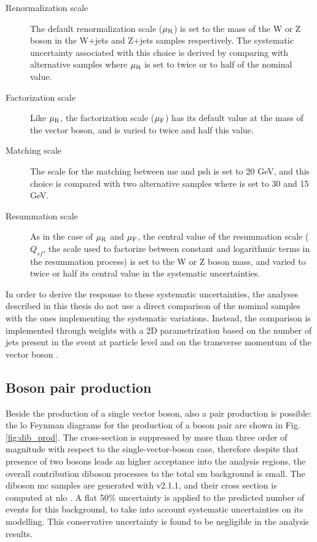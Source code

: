 \begin{description}
\item[Renormalization scale] The default renormalization scale ($\mu_{\rm{R}}$) is set to the mass of the W or Z boson in the W+jets and Z+jets samples respectively. 
The systematic uncertainty associated with this choice is derived by comparing with alternative samples where $\mu_{\rm{R}}$ is set to twice or to half of the nominal value. 

\item[Factorization scale] Like $\mu_{\rm{R}}$, the factorization scale ($\mu_{\rm{F}}$) has its default value at the mass of the vector boson, and is varied to twice and half this value.

\item[Matching scale] The scale for the matching between \gls{me} and \gls{psh} is set to 20 GeV, and this choice is compared with two alternative samples where is set to 30 and 15 GeV.

\item[Resummation scale] As in the case of $\mu_{\rm{R}}$ and $\mu_{\rm{F}}$, the central value of the resummation scale ($Q_{sf}$, the scale used to factorize between constant and logarithmic terms
in the resummation process) is set to the W or Z boson mass, and varied to twice or half its central value in the systematic uncertainties. 

\end{description}

In order to derive the response to these systematic uncertainties, the analyses described in this thesis do not use a direct comparison of the nominal 
samples with the ones implementing the systematic variations.
Instead, the comparison is implemented through weights with a 2D parametrization based on the number of jets present in the event at particle level 
and on the transverse momentum of the vector boson \cite{Anders:2291836}.


\subsection{Boson pair production}

Beside the production of a single vector boson, also a pair production is possible: 
the \gls{lo} Feynman diagrams for the production of a boson pair are shown in Fig. \ref{fig:dib_prod}.
The cross-section is suppressed by more than three order of magnitude with respect to the 
single-vector-boson case, therefore despite that presence of two bosons leads an higher acceptance into the analysis regions,
the overall contribution diboson processes to the total \gls{sm} background is small. 
The diboson \gls{mc} samples are generated with \Sherpa v2.1.1, and their cross section is computed at \gls{nlo} \cite{ATL-PHYS-PUB-2016-002,ATL-PHYS-PUB-2017-005}.
A flat 50\% uncertainty is applied to the predicted number of events for this background, to take into account 
systematic uncertainties on its modelling. This conservative uncertainty is found to be negligible in the analysis results. 


